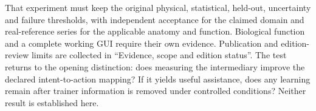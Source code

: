 That experiment must keep the original physical, statistical, held-out, uncertainty and failure thresholds, with independent acceptance for the claimed domain and real-reference series for the applicable anatomy and function. Biological function and a complete working GUI require their own evidence. Publication and edition-review limits are collected in ``Evidence, scope and edition status''. The test returns to the opening distinction: does measuring the intermediary improve the declared intent-to-action mapping? If it yields useful assistance, does any learning remain after trainer information is removed under controlled conditions? Neither result is established here.


